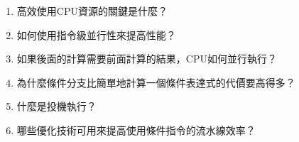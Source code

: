\begin{enumerate}
\item 高效使用CPU資源的關鍵是什麼？
\item 如何使用指令級並行性來提高性能？
\item 如果後面的計算需要前面計算的結果，CPU如何並行執行？
\item 為什麼條件分支比簡單地計算一個條件表達式的代價要高得多？
\item 什麼是投機執行？
\item 哪些優化技術可用來提高使用條件指令的流水線效率？
\end{enumerate}